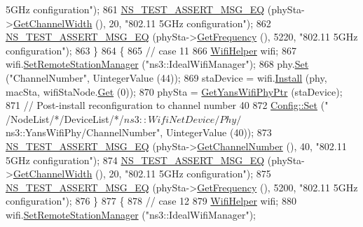 \begin{DoxyCode}
{       5GHz configuration"});
861     \hyperlink{group__testing_ga2a9d78cffb3db8e867c35fff0b698cf5}{NS\_TEST\_ASSERT\_MSG\_EQ} (phySta->\hyperlink{classns3_1_1WifiPhy_a4a5d5009b3b3308f2baeed42a2007189}{GetChannelWidth} (), 20, \textcolor{stringliteral}{"802.11 5GHz
       configuration"});
862     \hyperlink{group__testing_ga2a9d78cffb3db8e867c35fff0b698cf5}{NS\_TEST\_ASSERT\_MSG\_EQ} (phySta->\hyperlink{classns3_1_1WifiPhy_ad2508d94faf22d690d6b8b4367934fd1}{GetFrequency} (), 5220, \textcolor{stringliteral}{"802.11 5GHz
       configuration"});
863   \}
864   \{
865     \textcolor{comment}{// case 11}
866     \hyperlink{classns3_1_1WifiHelper}{WifiHelper} wifi;
867     wifi.\hyperlink{classns3_1_1WifiHelper_a3d01b178aeb2de246ab5a3aa5638ce24}{SetRemoteStationManager} (\textcolor{stringliteral}{"ns3::IdealWifiManager"});
868     phy.\hyperlink{classns3_1_1WifiPhyHelper_a2527d6d7b29f717fd7436166c5f05f1a}{Set} (\textcolor{stringliteral}{"ChannelNumber"}, UintegerValue (44));
869     staDevice = wifi.\hyperlink{classns3_1_1WifiHelper_a451b3d33fa1497c22f06c5451f57a127}{Install} (phy, macSta, wifiStaNode.\hyperlink{classns3_1_1NodeContainer_a9ed96e2ecc22e0f5a3d4842eb9bf90bf}{Get} (0));
870     phySta = \hyperlink{classSetChannelFrequencyTest_aa30a0a39f98c2d825152681ba8b9f4e1}{GetYansWifiPhyPtr} (staDevice);
871     \textcolor{comment}{// Post-install reconfiguration to channel number 40}
872     \hyperlink{group__config_gadce03667ec621d64ce4aace85d9bcfd0}{Config::Set} (\textcolor{stringliteral}{"
      /NodeList/*/DeviceList/*/$ns3::WifiNetDevice/Phy/$ns3::YansWifiPhy/ChannelNumber"}, UintegerValue (40));
873     \hyperlink{group__testing_ga2a9d78cffb3db8e867c35fff0b698cf5}{NS\_TEST\_ASSERT\_MSG\_EQ} (phySta->\hyperlink{classns3_1_1WifiPhy_a5cf0ccf06109ace61db51c83e91b7e8d}{GetChannelNumber} (), 40, \textcolor{stringliteral}{"802.11
       5GHz configuration"});
874     \hyperlink{group__testing_ga2a9d78cffb3db8e867c35fff0b698cf5}{NS\_TEST\_ASSERT\_MSG\_EQ} (phySta->\hyperlink{classns3_1_1WifiPhy_a4a5d5009b3b3308f2baeed42a2007189}{GetChannelWidth} (), 20, \textcolor{stringliteral}{"802.11 5GHz
       configuration"});
875     \hyperlink{group__testing_ga2a9d78cffb3db8e867c35fff0b698cf5}{NS\_TEST\_ASSERT\_MSG\_EQ} (phySta->\hyperlink{classns3_1_1WifiPhy_ad2508d94faf22d690d6b8b4367934fd1}{GetFrequency} (), 5200, \textcolor{stringliteral}{"802.11 5GHz
       configuration"});
876   \}
877   \{
878     \textcolor{comment}{// case 12}
879     \hyperlink{classns3_1_1WifiHelper}{WifiHelper} wifi;
880     wifi.\hyperlink{classns3_1_1WifiHelper_a3d01b178aeb2de246ab5a3aa5638ce24}{SetRemoteStationManager} (\textcolor{stringliteral}{"ns3::IdealWifiManager"});

\end{DoxyCode}
